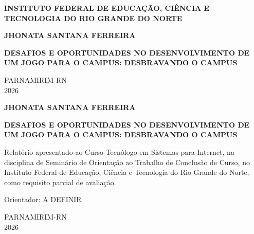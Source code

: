 \documentclass[12pt, a4paper]{article}
\begin{document}
\begin{titlepage}
    \begin{center}
        {\normalsize\bfseries INSTITUTO FEDERAL DE EDUCAÇÃO, CIÊNCIA E TECNOLOGIA DO RIO GRANDE DO NORTE}

        \vfill

        {\normalsize\bfseries JHONATA SANTANA FERREIRA}

        \vfill

        {\normalsize\bfseries DESAFIOS E OPORTUNIDADES NO DESENVOLVIMENTO DE UM JOGO PARA O CAMPUS: DESBRAVANDO O CAMPUS}

        \vfill

        {\normalsize PARNAMIRIM-RN}\\[0.3cm]
        {\normalsize 2026}
    \end{center}
\end{titlepage}

\begin{titlepage}
    \begin{center}
        {\normalsize\bfseries JHONATA SANTANA FERREIRA}

        \vfill

        {\normalsize\bfseries DESAFIOS E OPORTUNIDADES NO DESENVOLVIMENTO DE UM JOGO PARA O CAMPUS: DESBRAVANDO O CAMPUS}
    \end{center}

    \vfill

    \begin{flushright}
        \begin{minipage}{0.5\textwidth}
            \normalsize
            Relatório apresentado ao Curso Tecnólogo em Sistemas para Internet, na disciplina de  Seminário de Orientação ao Trabalho de Conclusão de Curso,
            no Instituto Federal de Educação, Ciência e Tecnologia do Rio Grande do Norte, como requisito parcial de avaliação.
            
            \vspace{0.8cm}
            Orientador: A DEFINIR
        \end{minipage}
    \end{flushright}

    \vfill

    \begin{center}
        {\normalsize PARNAMIRIM-RN}\\[0.3cm]
        {\normalsize 2026}
    \end{center}
\end{titlepage}
\end{document}
